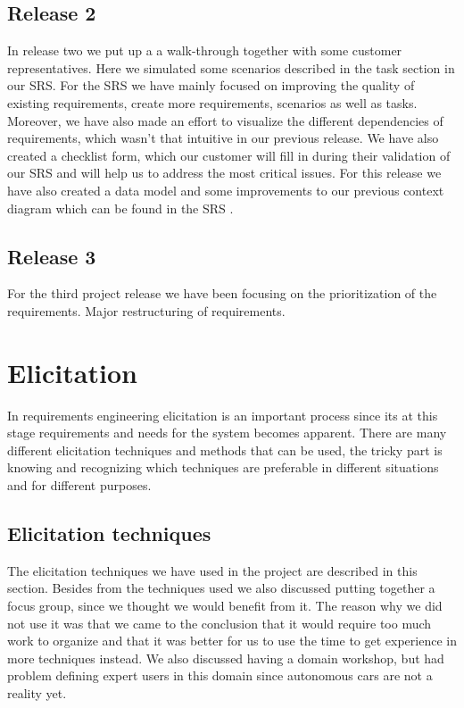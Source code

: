 \documentclass[10pt]{article}
\begin{document}
\subsection{Release 2}
In release two we put up a a walk-through together with some customer representatives. Here we simulated some scenarios described in the task section in our SRS. For the SRS we have mainly focused on improving the quality of existing requirements, create more requirements, scenarios as well as tasks. Moreover, we have also made an effort to visualize the different dependencies of requirements, which wasn't that intuitive in our previous release. We have also created a checklist form, which our customer will fill in during their validation of our SRS and will help us to address the most critical issues.
For this release we have also created a data model and some improvements to our previous context diagram which can be found in the SRS \cite{srs}.

\subsection{Release 3}
For the third project release we have been focusing on the prioritization of the requirements.
Major restructuring of requirements.

\section{Elicitation}
\sloppy
\noindent
{}
In requirements engineering elicitation is an important process since its at this stage requirements and needs for the system becomes apparent. There are many different elicitation techniques and methods that can be used, the tricky part is knowing and recognizing which techniques are preferable in different situations and for different purposes.

\subsection{Elicitation techniques}
The elicitation techniques we have used in the project are described in this section. Besides from the techniques used we also discussed putting together a focus group, since we thought we would benefit from it. The reason why we did not use it was that we came to the conclusion that it would require too much work to organize and that it was better for us to use the time to get experience in more techniques instead. We also discussed having a domain workshop, but had problem defining expert users in this domain since autonomous cars are not a reality yet.
\end{document}
